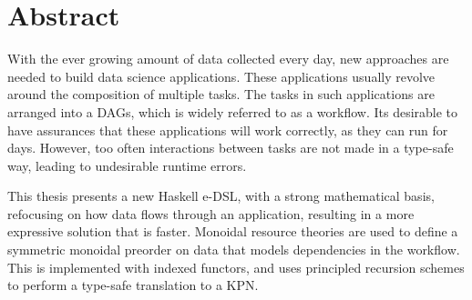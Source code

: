 \documentclass[dissertation.tex]{subfiles}
\begin{document}
\chapter*{Abstract}\label{chap:abstract}

With the ever growing amount of data collected every day, new approaches are needed to build data science applications.
These applications usually revolve around the composition of multiple tasks.
The tasks in such applications are arranged into a \acfp{DAG}, which is widely referred to as a workflow.
Its desirable to have assurances that these applications will work correctly, as they can run for days.
However, too often interactions between tasks are not made in a type-safe way, leading to undesirable runtime errors.


This thesis presents a new Haskell \acs{e-DSL}, with a strong mathematical basis, refocusing on how data flows through an application, resulting in a more expressive solution that is faster.
Monoidal resource theories are used to define a symmetric monoidal preorder on data that models dependencies in the workflow.
This is implemented with indexed functors, and uses principled recursion schemes to perform a type-safe translation to a \acf{KPN}.











\end{document}
